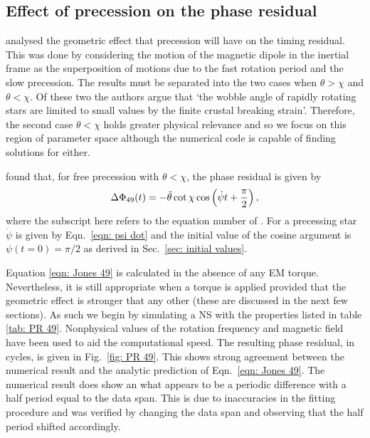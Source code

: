 \documentclass[../full_thesis/full_thesis.tex]{subfiles}
\begin{document}
\subsection{Effect of precession on the phase residual}

\citet{Jones2001} analysed the geometric effect that precession will have on
the timing residual. This was done by considering the motion of the magnetic
dipole in the inertial frame as the superposition of motions due to the fast
rotation period and the slow precession. The results must be separated into the
two cases when $\theta > \chi$ and $\theta < \chi$. Of these two the authors
argue that `the wobble angle  of rapidly rotating stars are limited to small
values by the finite crustal breaking strain'. Therefore, the second case
$\theta < \chi$ holds greater physical relevance and so we focus on this region
of parameter space although the numerical code is capable of finding solutions
for either.

\citet{Jones2001} found that, for free precession with $\theta < \chi$,
the phase residual is given by
\begin{equation}
    \Delta\Phi_{49}(t) = -\tilde{\theta} \cot\chi\cos\left(\dot{\psi}t + \frac{\pi}{2}\right),
    \label{eqn: Jones 49}
\end{equation}
where the subscript here refers to the equation number of \citet{Jones2001}.
For a precessing star $\dot{\psi}$ is given by Eqn.~\eqref{eqn: psi dot} and
the initial value of the cosine argument is $\psi(t=0)=\pi/2$ as derived in
Sec.~\ref{sec: initial values}.

Equation \eqref{eqn: Jones 49} is calculated in the absence of any EM torque.
Nevertheless, it is still appropriate when a torque is applied provided
that the geometric effect is stronger that any other (these are discussed in
the next few sections). As such we begin by simulating a NS with the properties
listed in table \ref{tab: PR 49}. Nonphysical values of the
rotation frequency and magnetic field have been used to aid the computational
speed. The resulting phase residual, in cycles, is given in Fig.~\ref{fig:
PR 49}.
This shows strong agreement between the numerical result and the analytic
prediction of Eqn.~\eqref{eqn: Jones 49}. The numerical result does show an
what appears to be a periodic difference with a half period equal to the
data span. This is due to inaccuracies in the fitting procedure and was verified
by changing the data span and observing that the half period shifted accordingly.
\end{document}
